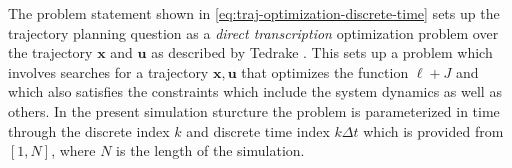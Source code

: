 \documentclass[]{article}
\begin{document}
	
	The problem statement shown in \cref{eq:traj-optimization-discrete-time} sets up the trajectory planning question as a \textit{direct transcription} optimization problem over the trajectory $\mathbf{x}$ and $\mathbf{u}$ as described by Tedrake \cite{tedrake_underactuated_nodate}.
	This sets up a problem which involves searches for a trajectory $\mathbf{x},\mathbf{u}$ that optimizes the function $\ell + J$ and which also satisfies the constraints which include the system dynamics as well as others. 
	In the present simulation sturcture the problem is parameterized in time through the discrete index $k$ and discrete time index $k\Delta t$ which is provided from $[1,N]$, where $N$ is the length of  the simulation.
	\\
\end{document}
